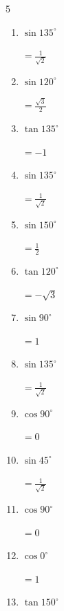 \begin{multicols}{5}
\begin{enumerate}
        $\displaystyle =0$

  \item $\displaystyle \sin{135^\circ}$

        $\displaystyle =\frac{1}{\sqrt{2}}$

  \item $\displaystyle \sin{120^\circ}$

        $\displaystyle =\frac{\sqrt{3}}{2}$

  \item $\displaystyle \tan{135^\circ}$

        $\displaystyle =-1$

  \item $\displaystyle \sin{135^\circ}$

        $\displaystyle =\frac{1}{\sqrt{2}}$

  \item $\displaystyle \sin{150^\circ}$

        $\displaystyle =\frac{1}{2}$

  \item $\displaystyle \tan{120^\circ}$

        $\displaystyle =-\sqrt{3}$

  \item $\displaystyle \sin{90^\circ}$

        $\displaystyle =1$

  \item $\displaystyle \sin{135^\circ}$

        $\displaystyle =\frac{1}{\sqrt{2}}$

  \item $\displaystyle \cos{90^\circ}$

        $\displaystyle =0$

  \item $\displaystyle \sin{45^\circ}$

        $\displaystyle =\frac{1}{\sqrt{2}}$

\columnbreak %

  \item $\displaystyle \cos{90^\circ}$

        $\displaystyle =0$

  \item $\displaystyle \cos{0^\circ}$

        $\displaystyle =1$

  \item $\displaystyle \tan{150^\circ}$


\end{enumerate}
\end{multicols}
